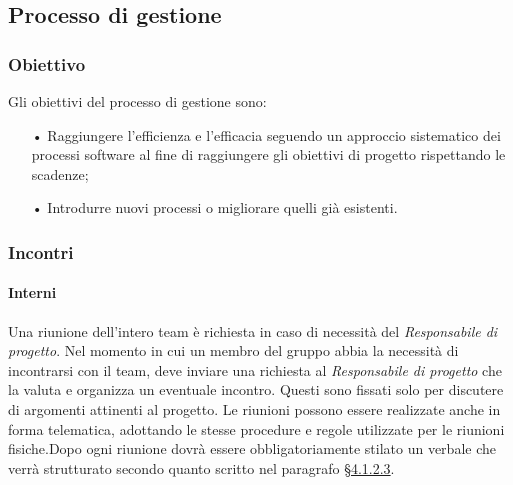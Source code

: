 \subsection{Processo di gestione}
\subsubsection{Obiettivo}
Gli obiettivi del processo di gestione sono:
\begin{itemize}
\item[•] Raggiungere l’efficienza e l’efficacia seguendo un approccio sistematico dei processi software al fine di raggiungere 
        gli obiettivi di progetto rispettando le scadenze;
\item[•] Introdurre nuovi processi o migliorare quelli già esistenti.
\end{itemize}

\subsubsection{Incontri}

\paragraph{Interni}
\label{sec:interni}
Una riunione dell'intero team è richiesta in caso di necessità del \textit{Responsabile di progetto}. Nel momento in cui un 
membro del gruppo abbia la necessità di incontrarsi con il team, deve inviare una richiesta al \textit{Responsabile di progetto} 
che la valuta e organizza un eventuale incontro. Questi sono fissati solo per discutere di argomenti attinenti al progetto.
Le riunioni possono essere realizzate anche in forma {telematica}, adottando le stesse procedure e regole utilizzate per 
le riunioni fisiche.Dopo ogni riunione dovrà essere obbligatoriamente stilato un verbale che verrà strutturato secondo 
quanto scritto nel paragrafo \hyperref[sec:verbali]{§4.1.2.3}.
